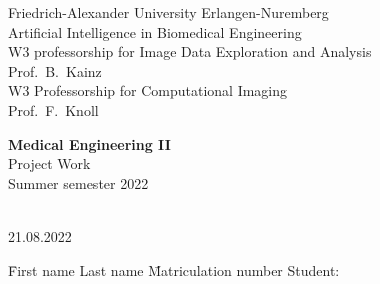 
\begin{titlepage}

\begin{center}
Friedrich-Alexander University Erlangen-Nuremberg\\
Artificial Intelligence in Biomedical Engineering\\
W3 professorship for Image Data Exploration and Analysis\\
Prof.\ B.\ Kainz\\
W3 Professorship for Computational Imaging\\
Prof.\ F.\ Knoll\\


\vspace*{9em}

{\huge \textbf{\textsf{Medical Engineering II}}}\\[.3em]
{Project Work}\\[.3em]
{Summer semester 2022}\\

\vspace*{9em}

{\huge \textbf{\textsf{\headline}}}\\[.7em]
{21.08.2022}
\end{center}

\vfill%
\begin{tabbing}
	\hspace*{5cm} \= First name Last name \hspace*{4em} \= Matriculation number \kill
	Student:\> \first \> \mnrfirst \\
\end{tabbing}

\end{titlepage}
